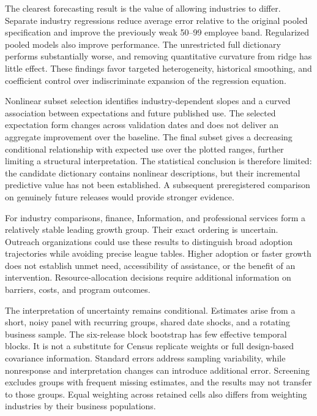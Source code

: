 The clearest forecasting result is the value of allowing industries to differ. Separate industry regressions reduce average error relative to the original pooled specification and improve the previously weak 50--99 employee band. Regularized pooled models also improve performance. The unrestricted full dictionary performs substantially worse, and removing quantitative curvature from ridge has little effect. These findings favor targeted heterogeneity, historical smoothing, and coefficient control over indiscriminate expansion of the regression equation.

Nonlinear subset selection identifies industry-dependent slopes and a curved association between expectations and future published use. The selected expectation form changes across validation dates and does not deliver an aggregate improvement over the baseline. The final subset gives a decreasing conditional relationship with expected use over the plotted ranges, further limiting a structural interpretation. The statistical conclusion is therefore limited: the candidate dictionary contains nonlinear descriptions, but their incremental predictive value has not been established. A subsequent preregistered comparison on genuinely future releases would provide stronger evidence.

For industry comparisons, finance, Information, and professional services form a relatively stable leading growth group. Their exact ordering is uncertain. Outreach organizations could use these results to distinguish broad adoption trajectories while avoiding precise league tables. Higher adoption or faster growth does not establish unmet need, accessibility of assistance, or the benefit of an intervention. Resource-allocation decisions require additional information on barriers, costs, and program outcomes.

The interpretation of uncertainty remains conditional. Estimates arise from a short, noisy panel with recurring groups, shared date shocks, and a rotating business sample. The six-release block bootstrap has few effective temporal blocks. It is not a substitute for Census replicate weights or full design-based covariance information. Standard errors address sampling variability, while nonresponse and interpretation changes can introduce additional error. Screening excludes groups with frequent missing estimates, and the results may not transfer to those groups. Equal weighting across retained cells also differs from weighting industries by their business populations.

